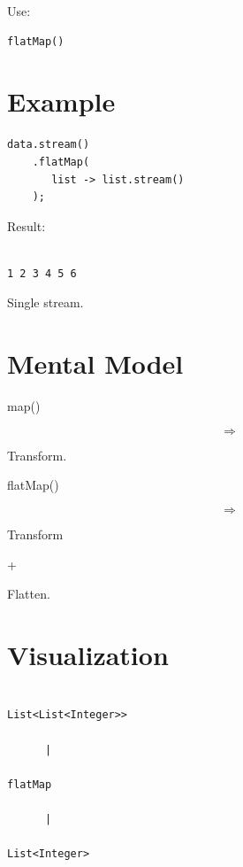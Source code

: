 \documentclass[11pt,a4paper]{book}
\begin{document}
Use:

\begin{verbatim} 
flatMap()
\end{verbatim}


\section{Example}

\begin{verbatim} 
data.stream()
    .flatMap(
       list -> list.stream()
    );
\end{verbatim}


Result:

\begin{verbatim}

1 2 3 4 5 6

\end{verbatim}


Single stream.


\section{Mental Model}

map()

\[
\Rightarrow
\]

Transform.


flatMap()

\[
\Rightarrow
\]

Transform

+

Flatten.


\section{Visualization}

\begin{verbatim}

List<List<Integer>>

      |

flatMap

      |

List<Integer>

\end{verbatim}
\end{document}
